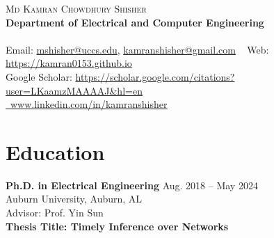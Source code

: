 \documentclass[letterpaper,11pt]{article}
\begin{document}

\begin{center}
    {\Huge \scshape Md Kamran Chowdhury Shisher} \\ \vspace{5pt}
    {\small \bf Department of Electrical and Computer Engineering} \\ \vspace{1pt}{\bf \small University of Colorado Colorado Springs, Colorado Springs, CO} \\ \vspace{1pt}
    \small
     Email: \href{mailto:mshisher@uccs.edu}{mshisher@uccs.edu}, \href{mailto:kamranshisher@gmail.com}{kamranshisher@gmail.com} ~
    Web: \url{https://kamran0153.github.io}~\\
    Google Scholar: \url{https://scholar.google.com/citations?user=LKaamzMAAAAJ&hl=en} \\ \vspace{1pt}
    \href{https://www.linkedin.com/in/kamranshisher/}{\raisebox{-0.2\height}\faLinkedin\ \underline{www.linkedin.com/in/kamranshisher}}
    
    \vspace{15pt}
\end{center}



\section*{Education}

\textbf{Ph.D. in Electrical Engineering} \hfill Aug. 2018 -- May 2024 \\
Auburn University, Auburn, AL  \\
{Advisor: Prof. Yin Sun} \\
{\bf Thesis Title: Timely Inference over Networks}
\medskip
\end{document}
